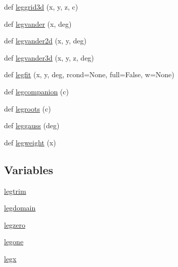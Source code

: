 \begin{DoxyCompactItemize}
\item 
def \hyperlink{namespacenumpy_1_1polynomial_1_1legendre_a2edd517d2e8dfb756db31cf9d4c23e3d}{leggrid3d} (x, y, z, c)
\item 
def \hyperlink{namespacenumpy_1_1polynomial_1_1legendre_ae910bfdd25cbfe134117aab5c71b7f64}{legvander} (x, deg)
\item 
def \hyperlink{namespacenumpy_1_1polynomial_1_1legendre_a2451a9e091f4c82c839b02ca4bbcd080}{legvander2d} (x, y, deg)
\item 
def \hyperlink{namespacenumpy_1_1polynomial_1_1legendre_a64d316b84919ca312b0f225e9c521c54}{legvander3d} (x, y, z, deg)
\item 
def \hyperlink{namespacenumpy_1_1polynomial_1_1legendre_acccd61d38479e586a720116a49d297cc}{legfit} (x, y, deg, rcond=None, full=False, w=None)
\item 
def \hyperlink{namespacenumpy_1_1polynomial_1_1legendre_a0238e400566b21d3aabc8fcbf75be125}{legcompanion} (c)
\item 
def \hyperlink{namespacenumpy_1_1polynomial_1_1legendre_a4e926e5c4890a7dc4f2d54be8b13f56d}{legroots} (c)
\item 
def \hyperlink{namespacenumpy_1_1polynomial_1_1legendre_a1009917878b9bf8953b616bd627a292f}{leggauss} (deg)
\item 
def \hyperlink{namespacenumpy_1_1polynomial_1_1legendre_a7975d5e8863f61429fa60dc1a16eff98}{legweight} (x)
\end{DoxyCompactItemize}
\subsection*{Variables}
\begin{DoxyCompactItemize}
\item 
\hyperlink{namespacenumpy_1_1polynomial_1_1legendre_a638ad2420f953f9395043c7085a2ce0b}{legtrim}
\item 
\hyperlink{namespacenumpy_1_1polynomial_1_1legendre_ac990e445d75c6564e7df33e135777983}{legdomain}
\item 
\hyperlink{namespacenumpy_1_1polynomial_1_1legendre_a1b416c35facad4ce9a5c6632cca73ba1}{legzero}
\item 
\hyperlink{namespacenumpy_1_1polynomial_1_1legendre_a1f1b9948404a7d17eb03df0bd2ca0906}{legone}
\item 
\hyperlink{namespacenumpy_1_1polynomial_1_1legendre_aedea4bf1332847404bf7709220df4102}{legx}
\end{DoxyCompactItemize}


